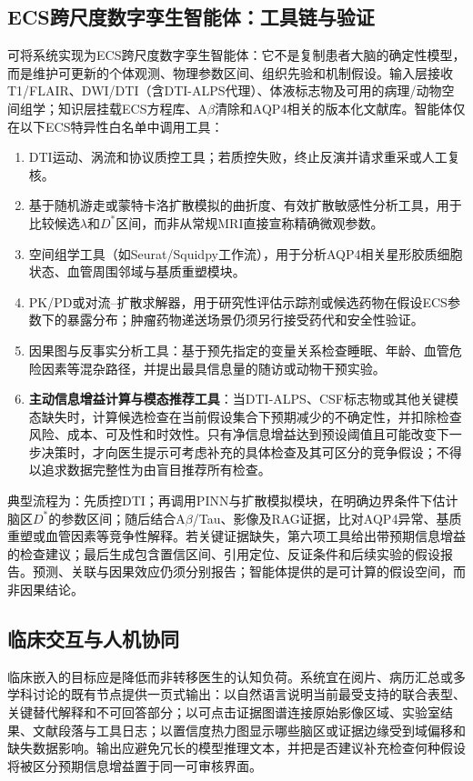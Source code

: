 ﻿\documentclass[11pt,a4paper]{article}
\begin{document}
\subsection{ECS跨尺度数字孪生智能体：工具链与验证}
可将系统实现为ECS跨尺度数字孪生智能体：它不是复制患者大脑的确定性模型，而是维护可更新的个体观测、物理参数区间、组织先验和机制假设。输入层接收T1/FLAIR、DWI/DTI（含DTI-ALPS代理）、体液标志物及可用的病理/动物空间组学；知识层挂载ECS方程库、A$\beta$清除和AQP4相关的版本化文献库。智能体仅在以下ECS特异性白名单中调用工具：
\begin{enumerate}
\item DTI运动、涡流和协议质控工具；若质控失败，终止反演并请求重采或人工复核。
\item 基于随机游走或蒙特卡洛扩散模拟的曲折度、有效扩散敏感性分析工具，用于比较候选$\lambda$和$D^*$区间，而非从常规MRI直接宣称精确微观参数。
\item 空间组学工具（如Seurat/Squidpy工作流），用于分析AQP4相关星形胶质细胞状态、血管周围邻域与基质重塑模块\cite{satija2015,palla2022}。
\item PK/PD或对流--扩散求解器，用于研究性评估示踪剂或候选药物在假设ECS参数下的暴露分布；肿瘤药物递送场景仍须另行接受药代和安全性验证。
\item 因果图与反事实分析工具：基于预先指定的变量关系检查睡眠、年龄、血管危险因素等混杂路径，并提出最具信息量的随访或动物干预实验。
\item \textbf{主动信息增益计算与模态推荐工具}：当DTI-ALPS、CSF标志物或其他关键模态缺失时，计算候选检查在当前假设集合下预期减少的不确定性，并扣除检查风险、成本、可及性和时效性。只有净信息增益达到预设阈值且可能改变下一步决策时，才向医生提示可考虑补充的具体检查及其可区分的竞争假设；不得以追求数据完整性为由盲目推荐所有检查。
\end{enumerate}
典型流程为：先质控DTI；再调用PINN与扩散模拟模块，在明确边界条件下估计脑区$D^*$的参数区间；随后结合A$\beta$/Tau、影像及RAG证据，比对AQP4异常、基质重塑或血管因素等竞争性解释。若关键证据缺失，第六项工具给出带预期信息增益的检查建议；最后生成包含置信区间、引用定位、反证条件和后续实验的假设报告。预测、关联与因果效应仍须分别报告；智能体提供的是可计算的假设空间，而非因果结论。

\subsection{临床交互与人机协同}
临床嵌入的目标应是降低而非转移医生的认知负荷。系统宜在阅片、病历汇总或多学科讨论的既有节点提供一页式输出：以自然语言说明当前最受支持的联合表型、关键替代解释和不可回答部分；以可点击证据图谱连接原始影像区域、实验室结果、文献段落与工具日志；以置信度热力图显示哪些脑区或证据边缘受到域偏移和缺失数据影响。输出应避免冗长的模型推理文本，并把是否建议补充检查何种假设将被区分预期信息增益置于同一可审核界面。
\end{document}
